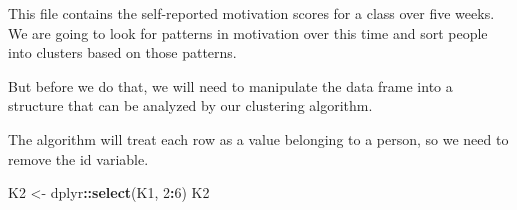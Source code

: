 \documentclass[]{article}
\newenvironment{Shaded}{\begin{snugshade}}{\end{snugshade}}
\newcommand{\DecValTok}[1]{\textcolor[rgb]{0.00,0.00,0.81}{#1}}
\newcommand{\KeywordTok}[1]{\textcolor[rgb]{0.13,0.29,0.53}{\textbf{#1}}}
\newcommand{\NormalTok}[1]{#1}
\newcommand{\OperatorTok}[1]{\textcolor[rgb]{0.81,0.36,0.00}{\textbf{#1}}}
\newcommand{\StringTok}[1]{\textcolor[rgb]{0.31,0.60,0.02}{#1}}
\begin{document}
This file contains the self-reported motivation scores for a class over
five weeks. We are going to look for patterns in motivation over this
time and sort people into clusters based on those patterns.

But before we do that, we will need to manipulate the data frame into a
structure that can be analyzed by our clustering algorithm.

The algorithm will treat each row as a value belonging to a person, so
we need to remove the id variable.

\begin{Shaded}
\begin{Highlighting}[]
\NormalTok{    K2 <-}\StringTok{ }\NormalTok{dplyr}\OperatorTok{::}\KeywordTok{select}\NormalTok{(K1, }\DecValTok{2}\OperatorTok{:}\DecValTok{6}\NormalTok{)}
\NormalTok{K2}
\end{Highlighting}
\end{Shaded}
\end{document}
